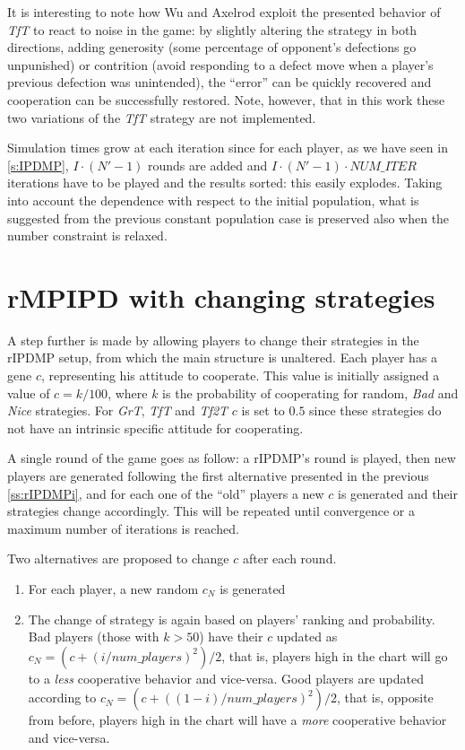 \documentclass[journal,10pt,twoside]{IEEEtran}
\begin{document}
It is interesting to note how Wu and Axelrod \cite{IPDnoise} exploit the presented behavior of \textit{TfT} to react to noise in the game: by slightly altering the strategy in both directions, adding generosity (some percentage of opponent's defections go unpunished) or contrition (avoid responding to a defect move when a player's previous defection was unintended), the ``error'' can be quickly recovered and cooperation can be successfully restored. Note, however, that in this work these two variations of the \textit{TfT} strategy are not implemented.

Simulation times grow at each iteration since for each player, as we have seen in \autoref{s:IPDMP}, $I\cdot(N'-1)$ rounds are added and $I\cdot(N'-1)\cdot{NUM\_ITER}$ iterations have to be played and the results sorted: this easily explodes. Taking into account the dependence with respect to the initial population, what is suggested from the previous constant population case is preserved also when the number constraint is relaxed.

\section{rMPIPD with changing strategies} \label{s:crIPDMP}
A step further is made by allowing players to change their strategies in the rIPDMP setup, from which the main structure is unaltered.
Each player has a gene $c$, representing his attitude to cooperate. This value is initially assigned a value of $c=k/100$, where $k$ is the probability of cooperating for random, \textit{Bad} and \textit{Nice} strategies. For \textit{GrT}, \textit{TfT} and \textit{Tf2T} $c$ is set to $0.5$ since these strategies do not have an intrinsic specific attitude for cooperating.
 
A single round of the game goes as follow: a rIPDMP's round is played, then new players are generated following the first alternative presented in the previous \autoref{ss:rIPDMPi}, and for each one of the ``old'' players a new $c$ is generated and their strategies change accordingly. This will be repeated until convergence or a maximum number of iterations is reached.

Two alternatives are proposed to change $c$ after each round.
\begin{enumerate}
    \item For each player, a new random $c_N$ is generated
    \item The change of strategy is again based on players' ranking and probability. Bad players (those with $k>50$) have their $c$ updated as
    $c_N = (c+(i/num\_players)^2)/2$, that is, players high in the chart will go to a \textit{less} cooperative behavior and vice-versa.
    Good players are updated according to $c_N = (c+((1-i)/num\_players)^2)/2$, that is, opposite from before, players high in the chart will have a \textit{more} cooperative behavior and vice-versa.
\end{enumerate}
\end{document}
